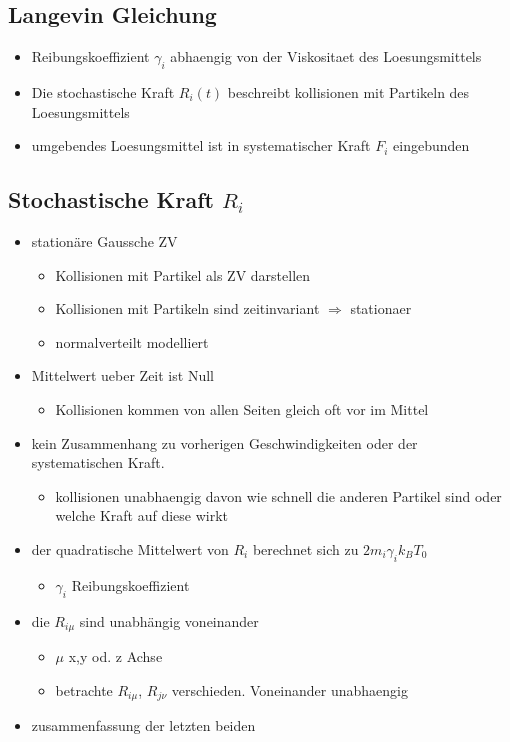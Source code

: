\documentclass[]{article}
\begin{document}
\subsection{Langevin Gleichung}
\begin{itemize}
  	\item Reibungskoeffizient $\gamma_i$ abhaengig von der Viskositaet des Loesungsmittels
  	\item Die stochastische Kraft $R_i(t)$ beschreibt kollisionen mit Partikeln des Loesungsmittels
  	\item umgebendes Loesungsmittel ist in systematischer Kraft $F_i$ eingebunden
\end{itemize}

\subsection{Stochastische Kraft $R_i$}
\begin{itemize}
	\item stationäre Gaussche ZV
	\begin{itemize}
		\item Kollisionen mit Partikel als ZV darstellen
		\item Kollisionen mit Partikeln sind zeitinvariant $\Rightarrow$ stationaer
		\item normalverteilt modelliert 
	\end{itemize}
	\item Mittelwert ueber Zeit ist Null
	\begin{itemize}
		\item Kollisionen kommen von allen Seiten gleich oft vor im Mittel
	\end{itemize}
	\item kein Zusammenhang zu vorherigen Geschwindigkeiten oder der systematischen Kraft.
	\begin{itemize}
		\item kollisionen unabhaengig davon wie schnell die anderen Partikel sind oder welche Kraft auf diese wirkt
	\end{itemize}	 
	\item der quadratische Mittelwert von $R_i$ berechnet sich zu $2 m_i \gamma_i k_B T_0$ %
	\begin{itemize}
		\item $\gamma_i$ Reibungskoeffizient
	\end{itemize}
	\item die $R_{i \mu}$ sind unabhängig voneinander
	\begin{itemize}
		\item $\mu$ x,y od. z Achse
		\item betrachte $R_{i \mu}$, $R_{j \nu}$ verschieden. Voneinander unabhaengig 
	\end{itemize}
	\item zusammenfassung der letzten beiden%
\end{itemize}
\end{document}
